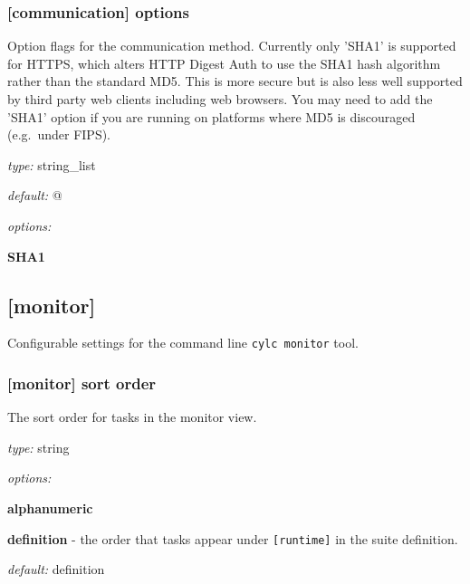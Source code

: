 \subsubsection[options]{[communication] \textrightarrow options}

Option flags for the communication method. Currently only 'SHA1' is
supported for HTTPS, which alters HTTP Digest Auth to use the SHA1 hash
algorithm rather than the standard MD5. This is more secure but is also
less well supported by third party web clients including web browsers.
You may need to add the 'SHA1' option if you are running on platforms
where MD5 is discouraged (e.g.\  under FIPS).

\begin{myitemize}
\item {\em type:} string\_list
\item {\em default:} \lstinline@[]@
\item {\em options:}
    \begin{myitemize}
        \item {\bf SHA1}
    \end{myitemize}
\end{myitemize}

\subsection{[monitor]}

Configurable settings for the command line \lstinline=cylc monitor= tool.

\subsubsection[monitor]{[monitor] \textrightarrow sort order}

The sort order for tasks in the monitor view.
\begin{myitemize}
    \item {\em type:} string
    \item {\em options:}
    \begin{myitemize}
        \item {\bf alphanumeric}
        \item {\bf definition} -  the order that tasks appear under
            \lstinline=[runtime]= in the suite definition.
    \end{myitemize}
    \item {\em default:} definition
\end{myitemize}

